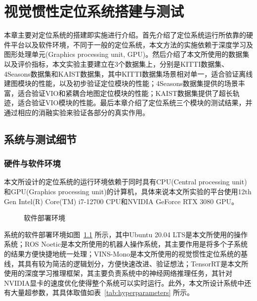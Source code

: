 




\chapter{视觉惯性定位系统搭建与测试}

本章主要对定位系统的搭建即实施进行介绍。首先介绍了定位系统运行所依靠的硬件平台以及软件环境，不同于一般的定位系统，本文方法的实施依赖于深度学习及图形处理单元(Graphics processing unit, GPU)。然后介绍了本文所使用的数据集以及评价指标，本文实验主要建立在3个数据集上，分别是KITTI数据集、4Seasons数据集和KAIST数据集，其中KITTI数据集场景相对单一，适合验证离线建图模块的性能，以及初步验证定位模块的性能；4Seasons数据集提供的场景丰富，适合验证VIO和紧耦合地图定位模块的性能；KAIST数据集提供了超长轨迹，适合验证VIO模块的性能。最后本章介绍了定位系统三个模块的测试结果，并通过相应的消融实验来验证各部分的真实作用。

\section{系统与测试细节}
\subsection{硬件与软件环境}

本文所设计的定位系统的运行环境依赖于同时具有CPU(Central processing unit)和GPU(Graphics processing unit)的计算机，具体来说本文所实验的平台使用12th Gen Intel(R) Core(TM) i7-12700 CPU和NVIDIA GeForce RTX 3080 GPU。

\begin{figure}
  \centering
  \caption{软件部署环境}
  \label{fig:software}
\end{figure}

系统的软件部署环境如图~\ref{fig:software} 所示，其中Ubuntu 20.04 LTS是本文所使用的操作系统；ROS Noetic是本文所使用的机器人操作系统，其主要作用是将多个子系统的结果方便快捷地统一处理；VINS-Mono是本文所使用的视觉惯性定位系统的基线，其具有较为简洁的逻辑划分，方便快速改进、验证想法；TensorRT是本文所使用的深度学习推理框架，其主要负责系统中的神经网络推理任务，其针对NVIDIA显卡的速度优化使得整个系统可以实时运行。此外，本文所设计系统中还有大量超参数，其具体取值如表~\ref{tab:hyperparameters} 所示。

